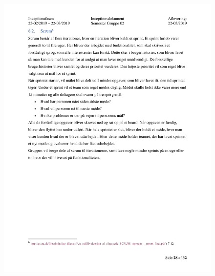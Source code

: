 \begin{figure}[hb]
  \includegraphics[scale = 0.33]{./PNG/Inceptions/Gruppe 02 + InceptionsDokument-29.jpg} 
\end{figure}

